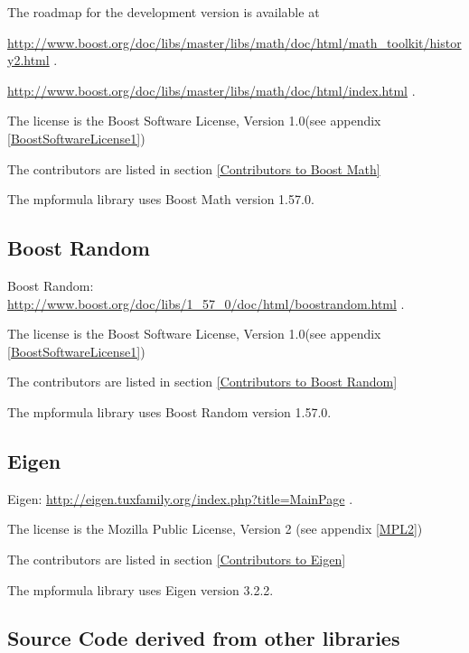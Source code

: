 The roadmap for the development version is available at

\href{http://www.boost.org/doc/libs/master/libs/math/doc/html/math_toolkit/history2.html}{http://www.boost.org/doc/libs/master/libs/math/doc/html/math\_toolkit/history2.html} . 

\href{http://www.boost.org/doc/libs/master/libs/math/doc/html/index.html}{http://www.boost.org/doc/libs/master/libs/math/doc/html/index.html} . 

The license is the Boost Software License, Version 1.0(see appendix \ref{BoostSoftwareLicense1})

The contributors are listed in section \ref{Contributors to Boost Math}

The mpformula library uses Boost Math version 1.57.0.



\subsection{Boost Random}
Boost Random: \href{http://www.boost.org/doc/libs/1_57_0/doc/html/boost_random.html}{http://www.boost.org/doc/libs/1\_57\_0/doc/html/boostrandom.html} . 

The license is the Boost Software License, Version 1.0(see appendix \ref{BoostSoftwareLicense1})

The contributors are listed in section \ref{Contributors to Boost Random}

The mpformula library uses Boost Random version 1.57.0.



\subsection{Eigen}
Eigen: \href{http://eigen.tuxfamily.org/index.php?title=Main_Page}{http://eigen.tuxfamily.org/index.php?title=MainPage} . 

The license is the Mozilla Public License, Version 2 (see appendix \ref{MPL2})

The contributors are listed in section \ref{Contributors to Eigen}

The mpformula library uses Eigen version 3.2.2.




\subsection{Source Code derived from other libraries}

